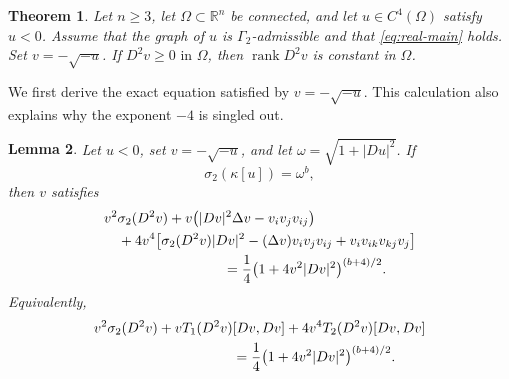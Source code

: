 \documentclass{article}
\newtheorem{theorem}{Theorem}[section]
\newtheorem{lemma}[theorem]{Lemma}
\newcommand{\R}{\mathbb R}
\newcommand{\rank}{\operatorname{rank}}
\numberwithin{equation}{section}
\begin{document}
\begin{theorem}\label{thm:realn}
Let $n\ge3$, let $\Omega\subset\R^n$ be connected, and let $u\in C^4(\Omega)$ satisfy $u<0$. Assume that the graph of $u$ is $\Gamma_2$-admissible and that \eqref{eq:real-main} holds. Set $v=-\sqrt{-u}$. If
$D^2v\ge0\,\,\text{in }\Omega$, then $\rank D^2v$ is constant in $\Omega$.
\end{theorem}

We first derive the exact equation satisfied by $v=-\sqrt{-u}$. This calculation also explains why the exponent $-4$ is singled out.%

\begin{lemma}\label{lem:real-transform}
Let $u<0$, set $v=-\sqrt{-u}$, and let $\omega=\sqrt{1+|Du|^2}$. If
\begin{equation}\label{eq:b-family}
\sigma_2(\kappa[u])=\omega^b,
\end{equation}
then $v$ satisfies
\begin{align}
&v^2\sigma_2(D^2v)
+v\bigl(|Dv|^2\Delta v-v_iv_jv_{ij}\bigr)\notag\\
&\quad
+4v^4\bigl[
\sigma_2(D^2v)|Dv|^2
-(\Delta v)v_iv_jv_{ij}
+v_iv_{ik}v_{kj}v_j
\bigr]\notag\\
&\hspace{30mm}
=\frac14\bigl(1+4v^2|Dv|^2\bigr)^{(b+4)/2}.
\label{eq:v-general-b}
\end{align}
Equivalently,
\begin{align}\label{eq:v-general-Newton}
&v^2\sigma_2(D^2v)
+vT_1(D^2v)[Dv,Dv]
+4v^4T_2(D^2v)[Dv,Dv]\notag\\
&\hspace{35mm}=\frac14\bigl(1+4v^2|Dv|^2\bigr)^{(b+4)/2}.
\end{align}
\end{lemma}
\end{document}
